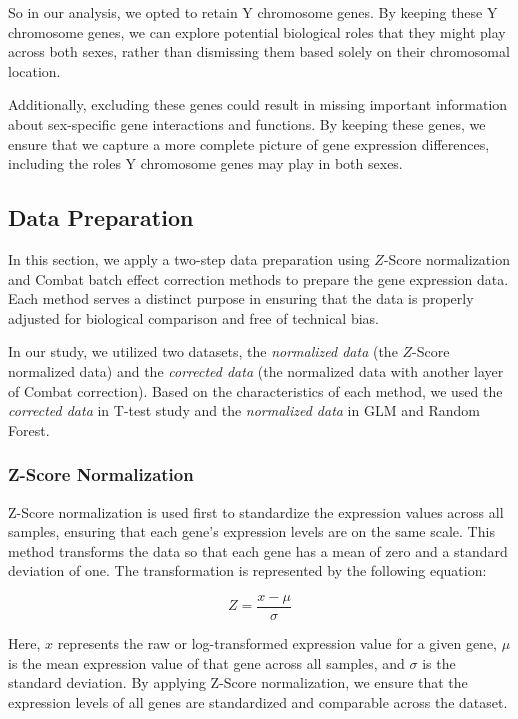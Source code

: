 \documentclass[12pt]{article}
\begin{document}
So in our analysis, we opted to retain Y chromosome genes. By keeping these Y chromosome genes, we can explore potential biological roles that they might play across both sexes, rather than dismissing them based solely on their chromosomal location.

Additionally, excluding these genes could result in missing important information about sex-specific gene interactions and functions. By keeping these genes, we ensure that we capture a more complete picture of gene expression differences, including the roles Y chromosome genes may play in both sexes.




\subsection{Data Preparation}

In this section, we apply a two-step data preparation using $Z$-Score normalization and Combat batch effect correction methods to prepare the gene expression data. Each method serves a distinct purpose in ensuring that the data is properly adjusted for biological comparison and free of technical bias.

In our study, we utilized two datasets, the \textit{normalized data} (the $Z$-Score normalized data) and the \textit{corrected data }(the normalized data with another layer of Combat correction). Based on the characteristics of each method, we used the \textit{corrected data} in T-test study and the \textit{normalized data} in GLM and Random Forest.



\subsubsection{Z-Score Normalization}

Z-Score normalization is used first to standardize the expression values across all samples, ensuring that each gene's expression levels are on the same scale. This method transforms the data so that each gene has a mean of zero and a standard deviation of one. The transformation is represented by the following equation:

\[
Z = \frac{x - \mu}{\sigma}
\]

Here, $x$ represents the raw or log-transformed expression value for a given gene, $\mu$ is the mean expression value of that gene across all samples, and $\sigma$ is the standard deviation. By applying Z-Score normalization, we ensure that the expression levels of all genes are standardized and comparable across the dataset.
\end{document}
